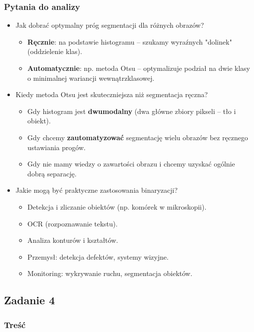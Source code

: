 \subsubsection{Pytania do analizy}

\begin{itemize}
	\item Jak dobrać optymalny próg segmentacji dla różnych obrazów?
	\begin{itemize}
		\item \textbf{Ręcznie}: na podstawie histogramu – szukamy wyraźnych "dolinek" (oddzielenie klas).
		\item \textbf{Automatycznie}: np. metoda Otsu – optymalizuje podział na dwie klasy o minimalnej wariancji wewnątrzklasowej.
	\end{itemize}
	
	\item Kiedy metoda Otsu jest skuteczniejsza niż segmentacja ręczna?
	\begin{itemize}
		\item Gdy histogram jest \textbf{dwumodalny} (dwa główne zbiory pikseli – tło i obiekt).
		\item Gdy chcemy \textbf{zautomatyzować} segmentację wielu obrazów bez ręcznego ustawiania progów.
		\item Gdy nie mamy wiedzy o zawartości obrazu i chcemy uzyskać ogólnie dobrą separację.
	\end{itemize}
	\clearpage
	
	\item Jakie mogą być praktyczne zastosowania binaryzacji?
	\begin{itemize}
		\item Detekcja i zliczanie obiektów (np. komórek w mikroskopii).
		\item OCR (rozpoznawanie tekstu).
		\item Analiza konturów i kształtów.
		\item Przemysł: detekcja defektów, systemy wizyjne.
		\item Monitoring: wykrywanie ruchu, segmentacja obiektów.
	\end{itemize}
\end{itemize}

\subsection{Zadanie 4}

\subsubsection{Treść}

